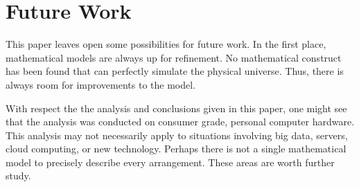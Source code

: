 \section{Future Work}
This paper leaves open some possibilities for future work. In the first place,
mathematical models are always up for refinement. No mathematical construct
has been found that can perfectly simulate the physical universe. Thus, there
is always room for improvements to the model.

With respect the the analysis and conclusions given in this paper, one might
see that the analysis was conducted on consumer grade, personal computer
hardware. This analysis may not necessarily apply to situations involving big
data, servers, cloud computing, or new technology. Perhaps there is not a
single mathematical model to precisely describe every arrangement. These areas 
are worth further study.